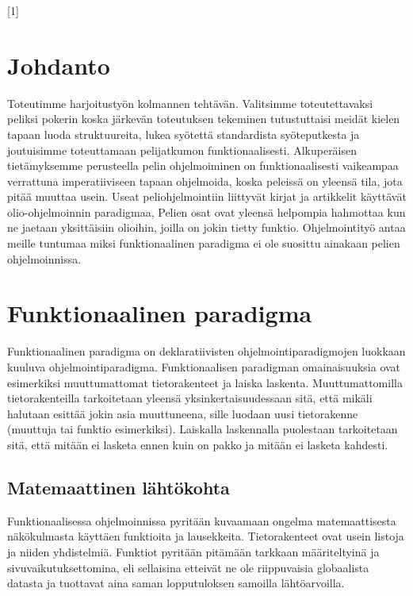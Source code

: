\documentclass[12pt]{article}
\begin{document}
[1]
{}
{}
% 

\maketitle

\newpage

\section{Johdanto}
Toteutimme harjoitustyön kolmannen tehtävän.
Valitsimme toteutettavaksi peliksi pokerin koska järkevän toteutuksen tekeminen tutustuttaisi meidät kielen tapaan luoda struktuureita,
lukea syötettä standardista syöteputkesta ja joutuisimme toteuttamaan pelijatkumon funktionaalisesti. Alkuperäisen tietämyksemme perusteella pelin ohjelmoiminen on funktionaalisesti vaikeampaa verrattuna imperatiiviseen tapaan ohjelmoida, koska peleissä on yleensä tila, jota pitää muuttaa usein. Useat peliohjelmointiin liittyvät kirjat ja artikkelit käyttävät olio-ohjelmoinnin paradigmaa, Pelien osat ovat yleensä helpompia hahmottaa kun ne jaetaan yksittäisiin olioihin, joilla on jokin tietty funktio. Ohjelmointityö antaa meille tuntumaa miksi funktionaalinen paradigma ei ole suosittu ainakaan pelien ohjelmoinnissa.

\newpage
\section{Funktionaalinen paradigma}
Funktionaalinen paradigma on deklaratiivisten ohjelmointiparadigmojen luokkaan kuuluva ohjelmointiparadigma. Funktionaalisen paradigman omainaisuuksia ovat esimerkiksi muuttumattomat tietorakenteet ja laiska laskenta. Muuttumattomilla tietorakenteilla tarkoitetaan yleensä yksinkertaisuudessaan sitä, että mikäli halutaan esittää jokin asia muuttuneena, sille luodaan uusi tietorakenne (muuttuja tai funktio esimerkiksi). Laiskalla laskennalla puolestaan tarkoitetaan sitä, että mitään ei lasketa ennen kuin on pakko ja mitään ei lasketa kahdesti.

\subsection{Matemaattinen lähtökohta}
Funktionaalisessa ohjelmoinnissa pyritään kuvaamaan ongelma matemaattisesta näkökulmasta käyttäen funktioita ja lausekkeita. Tietorakenteet ovat usein listoja ja niiden yhdistelmiä. Funktiot pyritään pitämään tarkkaan määriteltyinä ja sivuvaikutuksettomina, eli sellaisina etteivät ne ole riippuvaisia globaalista datasta ja tuottavat aina saman lopputuloksen samoilla lähtöarvoilla.
\end{document}
